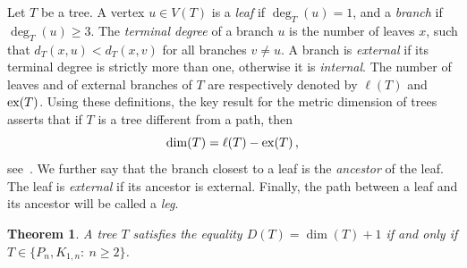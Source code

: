 \documentclass[12pt]{article}
\newtheorem{theorem}{Theorem}[section]
\DeclareMathOperator {\ex} {{\rm ex}}
\begin{document}
Let $T$ be a tree. A vertex $u\in V(T)$  is a {\em leaf} if $\deg_T(u) = 1$, and a {\em branch} if $\deg_T(u) \ge 3$. The {\em terminal degree} of a branch $u$ is the number of leaves $x$, such that $d_T(x, u) < d_T(x, v)$ for all branches $v\ne u$. A branch is {\em external} if its terminal degree is strictly more than one, otherwise it is {\em internal}. The number of leaves and of external branches of $T$ are respectively denoted by $\ell (T)$ and $\ex(T)$. Using these definitions, the key result for the metric dimension of trees asserts that if $T$ is a tree different from a path, then 
\begin{equation}
\label{eq:did-of-trees}
\dim(T) = \ell(T) - \ex(T)\,,  
\end{equation}
see~\cite{harary, Khuller, slater}.
We further say that the branch closest to a leaf is the {\em ancestor} of the leaf. The leaf is {\em external} if its ancestor is external. Finally, the path between a leaf and its ancestor will be called a {\em leg}. 

\begin{theorem}
\label{thm:trees}
A tree $T$ satisfies the equality $D(T) = \dim(T)+1$ if and only if $T \in\{P_n, K_{1,n}:\ n\ge 2\}$. 
\end{theorem}
\end{document}

